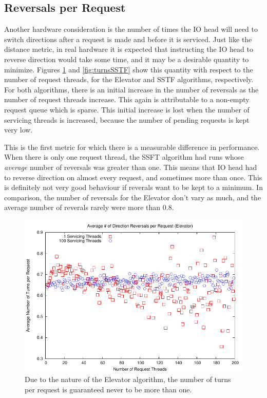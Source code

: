 \documentclass{report}
\begin{document}
\subsection{Reversals per Request}
Another hardware consideration is the number of times the IO head will need to switch
directions after a request is made and before it is serviced. Just like the distance
metric, in real hardware it is expected that instructing the IO head to reverse direction
would take some time, and it may be a desirable quantity to minimize. Figures
\ref{fig:turnsElevator} and \ref{fig:turnsSSTF} show this quantity with respect to the 
number of request threads, for the Elevator and SSTF algorithms, respectively.
For both algorithms, there is an initial increase in the number of reversals as the number
of request threads increase. This again is attributable to a non-empty request queue which
is sparse. This initial increase is lost when the number of servicing threads is
increased, because the number of pending requests is kept very low.

This is the first metric for which there is a measurable difference in performance. When
there is only one request thread, the SSFT algorithm had runs whose \emph{average} number
of reversals was greater than one. This means that IO head had to reverse direction on
almost every request, and sometimes more than once. This is definitely not very good
behaviour if reverals want to be kept to a minimum. In comparison, the number of reversals
for the Elevator don't vary as much, and the average number of reverals rarely were more
than 0.8.
\newpage
\begin{figure}[htb]
    \centering
    \includegraphics[scale=1]{turnsElevator.pdf}
    \caption{Due to the nature of the Elevator algorithm, the number of turns per request
    is guaranteed never to be more than one.}
    \label{fig:turnsElevator}
\end{figure}
\end{document}
